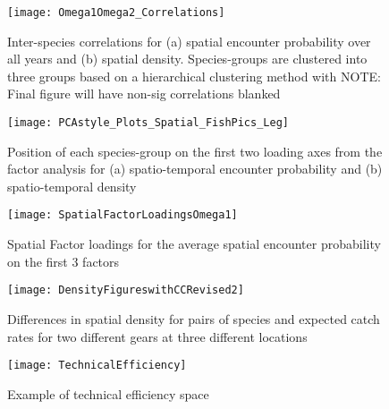 \documentclass{nature}
\begin{document}




\begin{figure}
\begin{center}
	\texttt{[image: Omega1Omega2\_Correlations]}
	\label{fig:1}
	\caption{Inter-species correlations for (a) spatial encounter
		probability over all years and (b) spatial density.
		Species-groups are clustered into three groups based on a
		hierarchical clustering method with NOTE: Final figure will
		have non-sig correlations blanked}
\end{center}
\end{figure}

\begin{figure}
\begin{center}
	\texttt{[image: PCAstyle\_Plots\_Spatial\_FishPics\_Leg]}
	\label{fig:2}
	\caption{Position of each species-group on the first two loading axes from the
	factor analysis for (a) spatio-temporal encounter probability and (b)
	spatio-temporal density}
\end{center}
\end{figure}

\begin{figure}
\begin{center}
	\texttt{[image: SpatialFactorLoadingsOmega1]}
	\label{fig:3}
	\caption{Spatial Factor loadings for the average spatial encounter
		probability on the first 3 factors}
\end{center}
\end{figure}

\begin{figure}
\begin{center}
	\texttt{[image: DensityFigureswithCCRevised2]}
	\label{fig:4}
	\caption{Differences in spatial density for pairs of species and
		expected catch rates for two different gears at three different
	locations}
\end{center}
\end{figure}

\begin{figure}
\begin{center}
	\texttt{[image: TechnicalEfficiency]}
	\label{fig:5}
	\caption{Example of technical efficiency space}
\end{center}
\end{figure}
\end{document}
